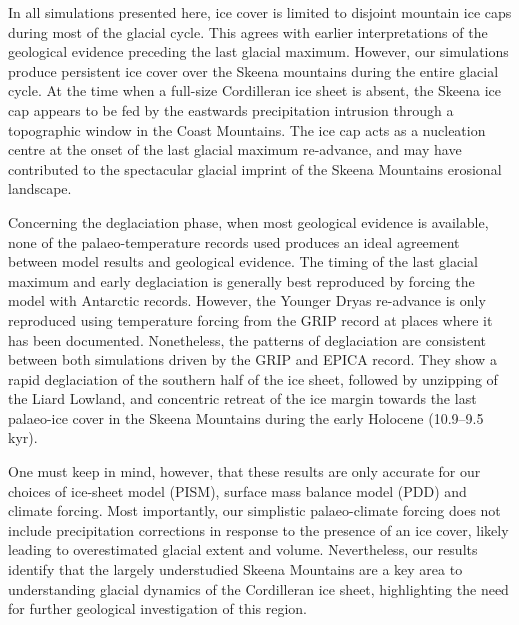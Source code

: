 \documentclass[tc, manuscript]{copernicus}
\begin{document}
In all simulations presented here, ice cover is limited to disjoint mountain ice
caps during most of the glacial cycle. This agrees with earlier interpretations
of the geological evidence preceding the last glacial maximum. However, our
simulations produce persistent ice cover over the Skeena mountains during
the entire glacial cycle. At the time when a full-size Cordilleran ice sheet is
absent, the Skeena ice cap appears to be fed by the eastwards precipitation
intrusion through a topographic window in the Coast Mountains. The ice cap acts
as a nucleation centre at the onset of the last glacial maximum re-advance, and
may have contributed to the spectacular glacial imprint of the Skeena Mountains
erosional landscape.

Concerning the deglaciation phase, when most geological evidence is available,
none of the palaeo-temperature records used produces an ideal agreement between
model results and geological evidence. The timing of the last glacial maximum
and early deglaciation is generally best reproduced by forcing the model with
Antarctic records. However, the Younger Dryas re-advance is only reproduced
using temperature forcing from the GRIP record at places where it has been
documented. Nonetheless, the patterns of deglaciation are consistent between
both simulations driven by the GRIP and EPICA record. They show a rapid
deglaciation of the southern half of the ice
sheet, followed by unzipping of the Liard Lowland, and concentric retreat of
the ice margin towards the last palaeo-ice cover in the Skeena Mountains
during the early Holocene (10.9--9.5\,kyr).

One must keep in mind, however, that these results are only accurate for our
choices of ice-sheet model (PISM), surface mass balance model (PDD) and climate
forcing. Most importantly, our simplistic
palaeo-climate forcing does not include precipitation corrections in response
to the presence of an ice cover, likely leading to overestimated glacial
extent and volume. Nevertheless, our results identify that the largely
understudied Skeena Mountains are a key area to understanding glacial dynamics
of the Cordilleran ice sheet, highlighting the need for further geological
investigation of this region.


%
%
\newpage
\end{document}
